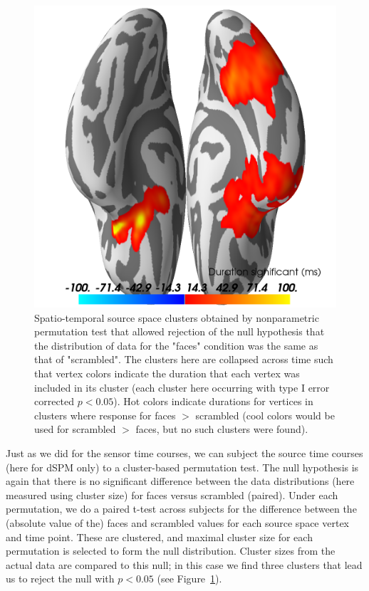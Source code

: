\begin{figure}
\centering
\begin{minipage}{0.5\linewidth}
\includegraphics[width=\linewidth]{figures/source_stats_highpass-NoneHz.png}
\end{minipage}
\caption[Spatio-temporal source space clusters obtained by nonparametric permutation test.]{Spatio-temporal source space clusters obtained by nonparametric permutation test that allowed rejection of the null hypothesis that the distribution of data for the "faces" condition was the same as that of "scrambled". The clusters here are collapsed across time such that vertex colors indicate the duration that each vertex was included in its cluster (each cluster here occurring with type I error corrected $p < 0.05$). Hot colors indicate durations for vertices in clusters where response for faces $>$ scrambled (cool colors would be used for scrambled $>$ faces, but no such clusters were found).}
\label{fig:fig_source_stats}
\end{figure}

Just as we did for the sensor time courses, we can subject the source time courses (here for dSPM only) to a cluster-based permutation test. The null hypothesis is again that there is no significant difference between the data distributions (here measured using cluster size) for faces versus scrambled (paired). Under each permutation, we do a paired t-test across subjects for the difference between the (absolute value of the) faces and scrambled values for each source space vertex and time point. These are clustered, and maximal cluster size for each permutation is selected to form the null distribution. Cluster sizes from the actual data are compared to this null; in this case we find three clusters that lead us to reject the null with $p < 0.05$ (see Figure~\ref{fig:fig_source_stats}).
 
